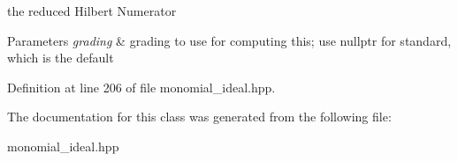 the reduced Hilbert Numerator 


\begin{DoxyParams}{Parameters}
{\em grading} & grading to use for computing this; use {\ttfamily nullptr} for standard, which is the default \\
\hline
\end{DoxyParams}


Definition at line 206 of file monomial\+\_\+ideal.\+hpp.



The documentation for this class was generated from the following file\+:\begin{DoxyCompactItemize}
\item 
monomial\+\_\+ideal.\+hpp\end{DoxyCompactItemize}
